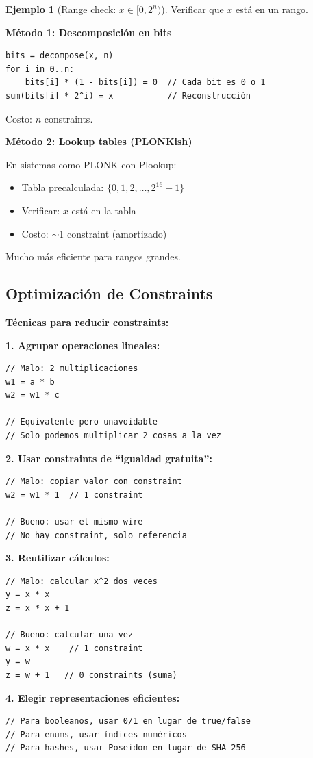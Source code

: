 \documentclass[11pt,a4paper,twoside,openright]{book}
\theoremstyle{definition}
\newtheorem{example}{Ejemplo}[chapter]
\theoremstyle{plain}
\theoremstyle{remark}
\begin{document}
\begin{example}[Range check: $x \in [0, 2^n)$]
Verificar que $x$ está en un rango.

\textbf{Método 1: Descomposición en bits}
\begin{verbatim}
bits = decompose(x, n)
for i in 0..n:
    bits[i] * (1 - bits[i]) = 0  // Cada bit es 0 o 1
sum(bits[i] * 2^i) = x           // Reconstrucción
\end{verbatim}

Costo: $n$ constraints.

\textbf{Método 2: Lookup tables (PLONKish)}

En sistemas como PLONK con Plookup:
\begin{itemize}
    \item Tabla precalculada: $\{0, 1, 2, \ldots, 2^{16}-1\}$
    \item Verificar: $x$ está en la tabla
    \item Costo: $\sim$1 constraint (amortizado)
\end{itemize}

Mucho más eficiente para rangos grandes.
\end{example}

\subsection{Optimización de Constraints}

\begin{keyidea}
\textbf{Técnicas para reducir constraints:}

\textbf{1. Agrupar operaciones lineales:}
\begin{verbatim}
// Malo: 2 multiplicaciones
w1 = a * b
w2 = w1 * c

// Equivalente pero unavoidable
// Solo podemos multiplicar 2 cosas a la vez
\end{verbatim}

\textbf{2. Usar constraints de ``igualdad gratuita'':}
\begin{verbatim}
// Malo: copiar valor con constraint
w2 = w1 * 1  // 1 constraint

// Bueno: usar el mismo wire
// No hay constraint, solo referencia
\end{verbatim}

\textbf{3. Reutilizar cálculos:}
\begin{verbatim}
// Malo: calcular x^2 dos veces
y = x * x
z = x * x + 1

// Bueno: calcular una vez
w = x * x    // 1 constraint
y = w
z = w + 1   // 0 constraints (suma)
\end{verbatim}

\textbf{4. Elegir representaciones eficientes:}
\begin{verbatim}
// Para booleanos, usar 0/1 en lugar de true/false
// Para enums, usar índices numéricos
// Para hashes, usar Poseidon en lugar de SHA-256
\end{verbatim}
\end{keyidea}
\end{document}
